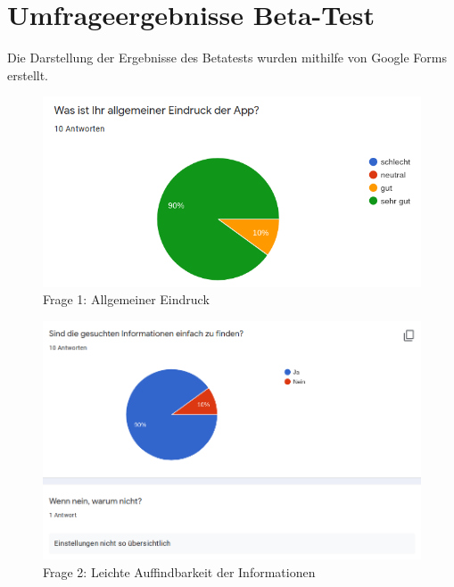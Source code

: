 \documentclass[oneside]{ausarbeitung}
\begin{document}
\chapter{Umfrageergebnisse Beta-Test}
\label{appendix:beta-test}
Die Darstellung der Ergebnisse des Betatests wurden mithilfe von Google Forms erstellt.
\begin{figure}[hptb]
	\centering
	\includegraphics[height=0.3\textheight]{images/umfrage-allgemeiner-eindruck.png}
	\caption{Frage 1: Allgemeiner Eindruck}
	\label{fig:beta:allgemein}
\end{figure}

\begin{figure}[hptb]
	\centering
	\includegraphics[height=0.5\textheight]{images/umfrage-einfach-zu-finden.png}
	\caption{Frage 2: Leichte Auffindbarkeit der Informationen}
	\label{fig:beta:einfach-zu-finden}
\end{figure}
\end{document}
